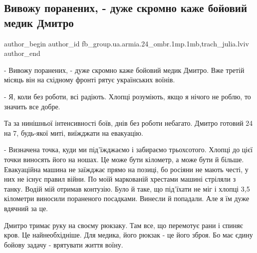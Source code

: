  
 
 
 
 
 
\subsection{Вивожу поранених, - дуже скромно каже бойовий медик Дмитро}
\label{sec:14_05_2022.fb.fb_group.ua.armia.24_ombr.1mp.1mb.1.medik}
 
\ifcmt
 author_begin
   author_id fb_group.ua.armia.24_ombr.1mp.1mb,trach_julia.lviv
 author_end
\fi

- Вивожу поранених, - дуже скромно каже бойовий медик Дмитро. Вже третій місяць
він на східному фронті рятує українських воїнів. 

- Я, коли без роботи, всі радіють. Хлопці розуміють, якщо я нічого не роблю, то
значить все добре.


Та за нинішньої інтенсивності боїв, днів без роботи небагато. Дмитро готовий 24
на 7, будь-якої миті, виїжджати на евакуацію.

- Визначена точка, куди ми під'їжджаємо і забираємо трьохсотого. Хлопці до цієї
точки виносять його на ношах. Це може бути кілометр, а може бути й більше.
Евакуаційна машина не заїжджає прямо на позиці, бо росіяни не мають честі, у
них не існує правил війни. По моїй маркованій хрестами машині стріляли з танку.
Водій мій отримав контузію. Було й таке, що під'їхати не міг і хлопці 3,5
кілометри виносили пораненого посадками. Винесли й попадали. Але я їм дуже
вдячний за це. 


Дмитро тримає руку на своєму рюкзаку. Там все, що перемотує рани і спиняє кров.
Це найнеобхідніше. Для медика, його рюкзак - це його зброя. Бо має єдину бойову
задачу - врятувати життя воїну. 

